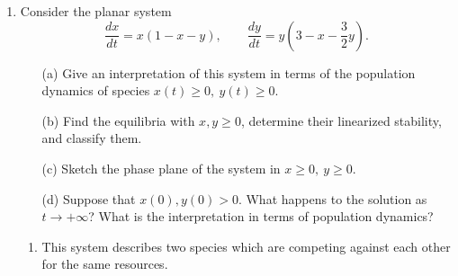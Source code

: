 \documentclass[10pt,letterpaper]{report}
\begin{document}
\begin{enumerate}
    \item 
    \begin{qbox}
    Consider the planar system
    \[
    \frac{dx}{dt} = x(1 - x - y), \qquad \frac{dy}{dt} = y\left(3 - x - \frac{3}{2}y\right).
    \]
    \begin{itemize}
        \item[(a)] Give an interpretation of this system in terms of the population dynamics of species $x(t) \geq 0,\ y(t) \geq 0$.
        \item[(b)] Find the equilibria with $x, y \geq 0$, determine their linearized stability, and classify them.
        \item[(c)] Sketch the phase plane of the system in $x \geq 0,\ y \geq 0$.
        \item[(d)] Suppose that $x(0), y(0) > 0$. What happens to the solution as $t \to +\infty$? What is the interpretation in terms of population dynamics?
    \end{itemize}
    \end{qbox}
    
    \begin{enumerate}
        \item This system describes two species which are competing against each other for the same resources.
        

\end{enumerate}
\end{enumerate}
\end{document}
